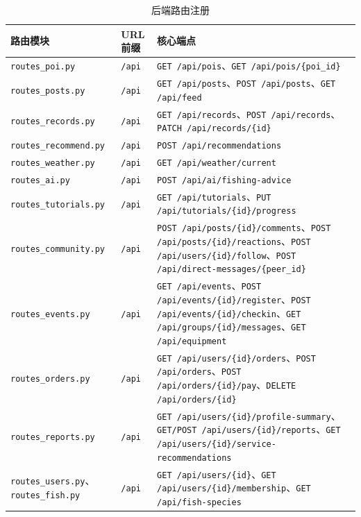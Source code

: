 \begin{table}[H]
  \centering
  \caption{后端路由注册}
  \label{tab:routes}
  \begin{tabularx}{\textwidth}{p{5cm}|p{5cm}|p{5cm}}
    \toprule
    \textbf{路由模块} & \textbf{URL 前缀} & \textbf{核心端点} \\
    \midrule
    \texttt{routes\_poi.py} & \texttt{/api} & \texttt{GET /api/pois}、\texttt{GET /api/pois/\{poi\_id\}} \\
    \hline
    \texttt{routes\_posts.py} & \texttt{/api} & \texttt{GET /api/posts}、\texttt{POST /api/posts}、\texttt{GET /api/feed} \\
    \hline
    \texttt{routes\_records.py} & \texttt{/api} & \texttt{GET /api/records}、\texttt{POST /api/records}、\texttt{PATCH /api/records/\{id\}} \\
    \hline
    \texttt{routes\_recommend.py} & \texttt{/api} & \texttt{POST /api/recommendations} \\
    \hline
    \texttt{routes\_weather.py} & \texttt{/api} & \texttt{GET /api/weather/current} \\
    \hline
    \texttt{routes\_ai.py} & \texttt{/api} & \texttt{POST /api/ai/fishing-advice} \\
    \hline
    \texttt{routes\_tutorials.py} & \texttt{/api} & \texttt{GET /api/tutorials}、\texttt{PUT /api/tutorials/\{id\}/progress} \\
    \hline
    \texttt{routes\_community.py} & \texttt{/api} & \texttt{POST /api/posts/\{id\}/comments}、\texttt{POST /api/posts/\{id\}/reactions}、\texttt{POST /api/users/\{id\}/follow}、\texttt{POST /api/direct-messages/\{peer\_id\}} \\
    \hline
    \texttt{routes\_events.py} & \texttt{/api} & \texttt{GET /api/events}、\texttt{POST /api/events/\{id\}/register}、\texttt{POST /api/events/\{id\}/checkin}、\texttt{GET /api/groups/\{id\}/messages}、\texttt{GET /api/equipment} \\
    \hline
    \texttt{routes\_orders.py} & \texttt{/api} & \texttt{GET /api/users/\{id\}/orders}、\texttt{POST /api/orders}、\texttt{POST /api/orders/\{id\}/pay}、\texttt{DELETE /api/orders/\{id\}} \\
    \hline
    \texttt{routes\_reports.py} & \texttt{/api} & \texttt{GET /api/users/\{id\}/profile-summary}、\texttt{GET/POST /api/users/\{id\}/reports}、\texttt{GET /api/users/\{id\}/service-recommendations} \\
    \hline
    \texttt{routes\_users.py}、\texttt{routes\_fish.py} & \texttt{/api} & \texttt{GET /api/users/\{id\}}、\texttt{GET /api/users/\{id\}/membership}、\texttt{GET /api/fish-species} \\
    \bottomrule
  \end{tabularx}
\end{table}

